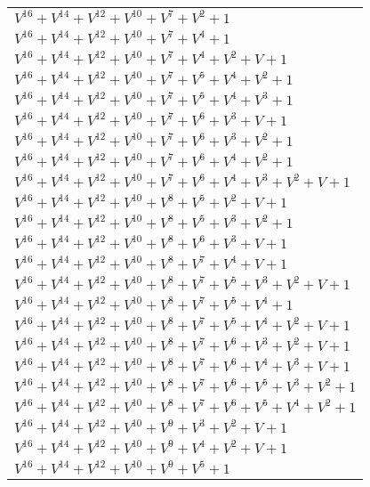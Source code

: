 \documentclass[12pt]{article}
\begin{document}
\begin{adjustwidth}{-4cm}{}
\begin{center}
\begin{longtable}{|l|}
$V^{16}  +V^{14}  +V^{12}  +V^{10}  +V^{7}  +V^{2}  + 1$ \\
$V^{16}  +V^{14}  +V^{12}  +V^{10}  +V^{7}  +V^{4}  + 1$ \\
$V^{16}  +V^{14}  +V^{12}  +V^{10}  +V^{7}  +V^{4}  +V^{2}  + V + 1$ \\
$V^{16}  +V^{14}  +V^{12}  +V^{10}  +V^{7}  +V^{5}  +V^{4}  +V^{2}  + 1$ \\
$V^{16}  +V^{14}  +V^{12}  +V^{10}  +V^{7}  +V^{5}  +V^{4}  +V^{3}  + 1$ \\
$V^{16}  +V^{14}  +V^{12}  +V^{10}  +V^{7}  +V^{6}  +V^{3}  + V + 1$ \\
$V^{16}  +V^{14}  +V^{12}  +V^{10}  +V^{7}  +V^{6}  +V^{3}  +V^{2}  + 1$ \\
$V^{16}  +V^{14}  +V^{12}  +V^{10}  +V^{7}  +V^{6}  +V^{4}  +V^{2}  + 1$ \\
$V^{16}  +V^{14}  +V^{12}  +V^{10}  +V^{7}  +V^{6}  +V^{4}  +V^{3}  +V^{2}  + V + 1$ \\
$V^{16}  +V^{14}  +V^{12}  +V^{10}  +V^{8}  +V^{5}  +V^{2}  + V + 1$ \\
$V^{16}  +V^{14}  +V^{12}  +V^{10}  +V^{8}  +V^{5}  +V^{3}  +V^{2}  + 1$ \\
$V^{16}  +V^{14}  +V^{12}  +V^{10}  +V^{8}  +V^{6}  +V^{3}  + V + 1$ \\
$V^{16}  +V^{14}  +V^{12}  +V^{10}  +V^{8}  +V^{7}  +V^{4}  + V + 1$ \\
$V^{16}  +V^{14}  +V^{12}  +V^{10}  +V^{8}  +V^{7}  +V^{5}  +V^{3}  +V^{2}  + V + 1$ \\
$V^{16}  +V^{14}  +V^{12}  +V^{10}  +V^{8}  +V^{7}  +V^{5}  +V^{4}  + 1$ \\
$V^{16}  +V^{14}  +V^{12}  +V^{10}  +V^{8}  +V^{7}  +V^{5}  +V^{4}  +V^{2}  + V + 1$ \\
$V^{16}  +V^{14}  +V^{12}  +V^{10}  +V^{8}  +V^{7}  +V^{6}  +V^{3}  +V^{2}  + V + 1$ \\
$V^{16}  +V^{14}  +V^{12}  +V^{10}  +V^{8}  +V^{7}  +V^{6}  +V^{4}  +V^{3}  + V + 1$ \\
$V^{16}  +V^{14}  +V^{12}  +V^{10}  +V^{8}  +V^{7}  +V^{6}  +V^{5}  +V^{3}  +V^{2}  + 1$ \\
$V^{16}  +V^{14}  +V^{12}  +V^{10}  +V^{8}  +V^{7}  +V^{6}  +V^{5}  +V^{4}  +V^{2}  + 1$ \\
$V^{16}  +V^{14}  +V^{12}  +V^{10}  +V^{9}  +V^{3}  +V^{2}  + V + 1$ \\
$V^{16}  +V^{14}  +V^{12}  +V^{10}  +V^{9}  +V^{4}  +V^{2}  + V + 1$ \\
$V^{16}  +V^{14}  +V^{12}  +V^{10}  +V^{9}  +V^{5}  + 1$ \\

\end{longtable}
\end{center}
\end{adjustwidth}
\end{document}
